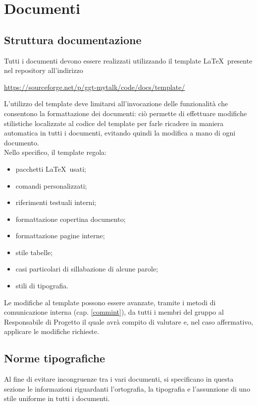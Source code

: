 \section{Documenti} {
	\label{commitDoc}
	\subsection{Struttura documentazione}{ 
		Tutti i documenti devono essere realizzati utilizzando il template \LaTeX \ presente nel repository\g
		all'indirizzo
		\begin{center}
			\url{https://sourceforge.net/p/ggt-mytalk/code/docs/template/}
		\end{center}
		L'utilizzo del template deve limitarsi all'invocazione delle funzionalità che consentono la formattazione dei documenti: ciò permette di effettuare modifiche stilistiche localizzate al codice del template per farle ricadere in maniera automatica in tutti i documenti, evitando quindi la modifica a mano di ogni documento.\\
		Nello specifico, il template regola:
		\begin{itemize}
			\item pacchetti \LaTeX\ usati;
			\item comandi personalizzati;
			\item riferimenti testuali interni;
			\item formattazione copertina documento;
			\item formattazione pagine interne;
			\item stile tabelle;
			\item casi particolari di sillabazione di alcune parole;
			\item stili di tipografia.
		\end{itemize}
		Le modifiche al template possono essere avanzate, tramite i metodi di comunicazione interna (cap. \ref{commint}), da tutti i membri del gruppo al Responsabile di Progetto il quale avrà compito di valutare e, nel caso affermativo, applicare le modifiche richieste.
	}

	\subsection{Norme tipografiche}{
	\label{NorTip}
		Al fine di evitare incongruenze tra i vari documenti, si specificano in questa sezione le informazioni riguardanti 
		l'ortografia, la tipografia e l'assunzione di uno stile uniforme in tutti i documenti.
}}
